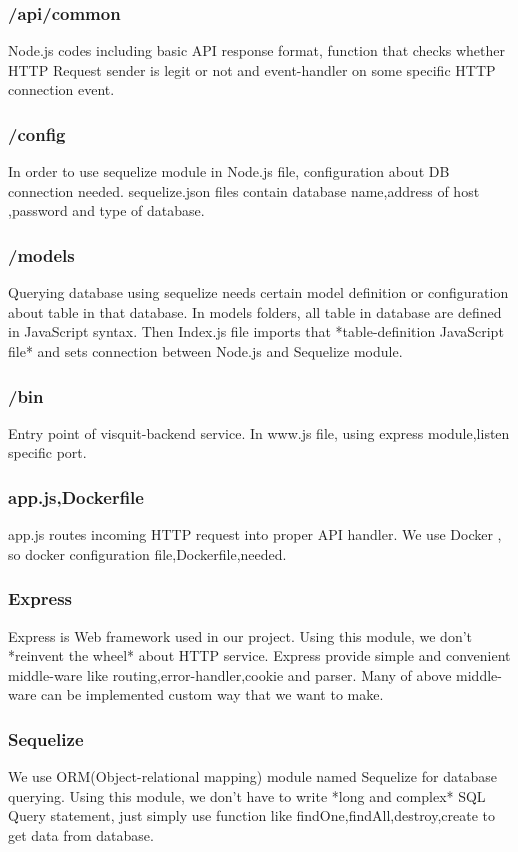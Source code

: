\documentclass[conference,compsoc]{IEEEtran}
\begin{document}
\subsubsection{/api/common} 
Node.js codes including basic API response format, function that checks whether HTTP Request sender is legit or not and event-handler on some specific HTTP connection event. 

\subsubsection{/config}
In order to use sequelize module in Node.js file, configuration about DB connection needed. sequelize.json files contain database name,address of host ,password and type of database.

\subsubsection{/models}
Querying database using sequelize needs certain model definition or configuration about table in that database. In models folders, all table in database are defined in JavaScript syntax. Then Index.js file imports that *table-definition JavaScript file* and sets connection between Node.js and Sequelize module.

\subsubsection{/bin}
Entry point of visquit-backend service. In www.js file, using express module,listen specific port.

\subsubsection{app.js,Dockerfile}
app.js routes incoming HTTP request into proper API handler. We use Docker , so docker configuration file,Dockerfile,needed.

\subsubsection{Express}
Express is Web framework used in our project. Using this module, we don't *reinvent the wheel* about HTTP service. Express provide simple and convenient middle-ware like routing,error-handler,cookie and parser. Many of above middle-ware can be implemented custom way that we want to make.

\subsubsection{Sequelize}
We use ORM(Object-relational mapping) module named Sequelize for database querying. Using this module, we don't have to write *long and complex* SQL Query statement, just simply use function like findOne,findAll,destroy,create to get data from database.
\end{document}
